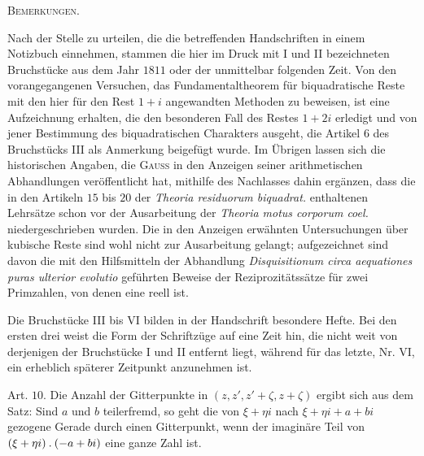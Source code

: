 
\par\bigskip{}
\begin{center}\large\scshape Bemerkungen.\end{center}
Nach der Stelle zu urteilen, die die betreffenden Handschriften in einem Notizbuch einnehmen, stammen die hier im Druck mit I und II bezeichneten Bruchstücke aus dem Jahr $1811$ oder der unmittelbar folgenden Zeit. Von den vorangegangenen Versuchen, das Fundamentaltheorem für biquadratische Reste mit den hier für den Rest $1+i$ angewandten Methoden zu beweisen, ist eine Aufzeichnung erhalten, die den besonderen Fall des Restes $1+2i$ erledigt und von jener Bestimmung des biquadratischen Charakters ausgeht, die Artikel $6$ des Bruchstücks III als Anmerkung beigefügt wurde. Im Übrigen lassen sich die historischen Angaben, die \textsc{Gauss} in den Anzeigen seiner arithmetischen Abhandlungen veröffentlicht hat, mithilfe des Nachlasses dahin ergänzen, dass die in den Artikeln $15$ bis $20$ der \emph{Theoria residuorum biquadrat.} enthaltenen Lehrsätze schon vor der Ausarbeitung der \emph{Theoria motus corporum coel.} niedergeschrieben wurden. Die in den Anzeigen erwähnten Untersuchungen über kubische Reste sind wohl nicht zur Ausarbeitung gelangt; aufgezeichnet sind davon die mit den Hilfsmitteln der Abhandlung \emph{Disquisitionum circa aequationes puras ulterior evolutio} geführten Beweise der Reziprozitätssätze für zwei Primzahlen, von denen eine reell ist.

Die Bruchstücke III bis VI bilden in der Handschrift besondere Hefte. Bei den ersten drei weist die Form der Schriftzüge auf eine Zeit hin, die nicht weit von derjenigen der Bruchstücke I und II entfernt liegt, während für das letzte, Nr. VI, ein erheblich späterer Zeitpunkt anzunehmen ist.

\par\medskip
[I.] Art. $10$. Die Anzahl der Gitterpunkte in $(z,z',z'+\zeta,z+\zeta)$ ergibt sich aus dem Satz: Sind $a$ und $b$ teilerfremd, so geht die von $\xi+\eta i$ nach $\xi+\eta i+a+bi$ gezogene Gerade durch einen Gitterpunkt, wenn der imaginäre Teil von $(\xi+\eta i)\mathbin{.}(-a+bi)$ eine ganze Zahl ist.


